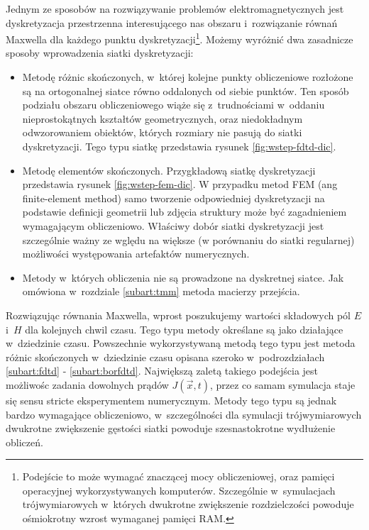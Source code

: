 Jednym ze sposobów na rozwiązywanie problemów elektromagnetycznych jest dyskretyzacja przestrzenna interesującego nas obszaru i~rozwiązanie równań Maxwella dla każdego punktu dyskretyzacji\footnote{Podejście to może wymagać znaczącej mocy obliczeniowej, oraz pamięci operacyjnej wykorzystywanych komputerów. Szczególnie w~symulacjach trójwymiarowych w~których dwukrotne zwiększenie rozdzielczości powoduje ośmiokrotny wzrost wymaganej pamięci RAM. }. Możemy wyróżnić dwa zasadnicze sposoby wprowadzenia siatki dyskretyzacji:
\begin{itemize}
\item Metodę różnic skończonych, w~której kolejne punkty obliczeniowe rozłożone są na ortogonalnej siatce równo oddalonych od siebie punktów. Ten sposób podziału obszaru obliczeniowego wiąże się z~trudnościami w~oddaniu nieprostokątnych kształtów geometrycznych, oraz niedokładnym odwzorowaniem obiektów, których rozmiary nie pasują do siatki dyskretyzacji. Tego typu siatkę przedstawia rysunek \ref{fig:wstep-fdtd-dic}.
\item Metodę elementów skończonych. Przygkładową siatkę dyskretyzacji przedstawia rysunek \ref{fig:wstep-fem-dic}. W przypadku metod  FEM (ang finite-element method) samo tworzenie odpowiedniej dyskretyzacji na podstawie definicji geometrii lub zdjęcia struktury może być zagadnieniem wymagającym obliczeniowo. Właściwy dobór siatki dyskretyzacji jest szczególnie ważny ze wględu na większe (w porównaniu do siatki regularnej) możliwości występowania artefaktów numerycznych.  
\item Metody w~których obliczenia nie są prowadzone na dyskretnej siatce. Jak omówiona w~rozdziale \ref{subart:tmm} metoda macierzy przejścia.
\end{itemize}

Rozwiązując równania Maxwella, wprost poszukujemy wartości składowych pól $E$ i~$H$ dla kolejnych chwil czasu. Tego typu metody określane są jako działające w~dziedzinie czasu. Powszechnie wykorzystywaną metodą tego typu jest metoda różnic skończonych w~dziedzinie czasu opisana szeroko w~podrozdziałach \ref{subart:fdtd} - \ref{subart:borfdtd}. Największą zaletą takiego podejścia jest możliwośc zadania dowolnych prądów $J(\vec{x},t)$, przez co samam symulacja staje się sensu stricte eksperymentem numerycznym. Metody tego typu są jednak bardzo wymagające obliczeniowo, w~szczególności dla symulacji trójwymiarowych dwukrotne zwiększenie gęstości siatki powoduje szesnastokrotne wydłużenie obliczeń. 

